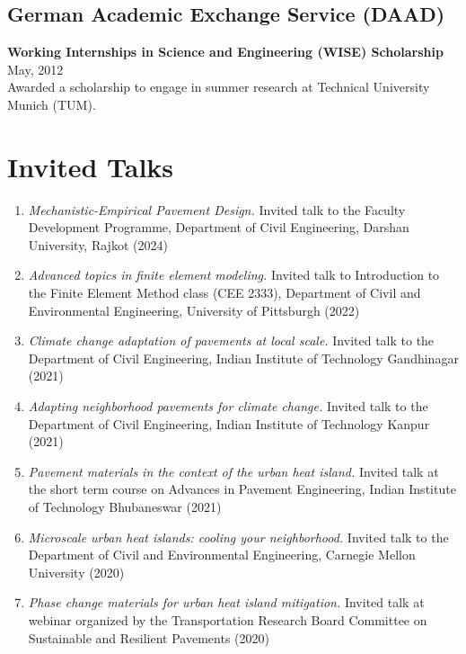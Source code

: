 \documentclass[12pt]{article}
\begin{document}
\subsection*{German Academic Exchange Service (DAAD)}
\textbf{Working Internships in Science and Engineering (WISE) Scholarship} \hfill May, 2012 \\
Awarded a scholarship to engage in summer research at Technical University Munich (TUM). 

\bigskip
\section*{Invited Talks}
\hfill
\begin{enumerate}
	\item \textit{Mechanistic-Empirical Pavement Design.} Invited talk to the Faculty Development Programme, Department of Civil Engineering, Darshan University, Rajkot (2024)
	\item \textit{Advanced topics in finite element modeling.} Invited talk to Introduction to the Finite Element Method class (CEE 2333), Department of Civil and Environmental Engineering, University of Pittsburgh (2022)
	\item \textit{Climate change adaptation of pavements at local scale.} Invited talk to the Department of Civil Engineering, Indian Institute of Technology Gandhinagar (2021)	
	\item \textit{Adapting neighborhood pavements for climate change.} Invited talk to the Department of Civil Engineering, Indian Institute of Technology Kanpur (2021)	
	\item \textit{Pavement materials in the context of the urban heat island.} Invited talk at the short term course on Advances in Pavement Engineering, Indian Institute of Technology Bhubaneswar (2021)	
	\item \textit{Microscale urban heat islands: cooling your neighborhood.} Invited talk to the Department of Civil and Environmental Engineering, Carnegie Mellon University (2020)
	\item \textit{Phase change materials for urban heat island mitigation.} Invited talk at webinar organized by the Transportation Research Board Committee on Sustainable and Resilient Pavements (2020)
\end{enumerate}

\bigskip
\end{document}
